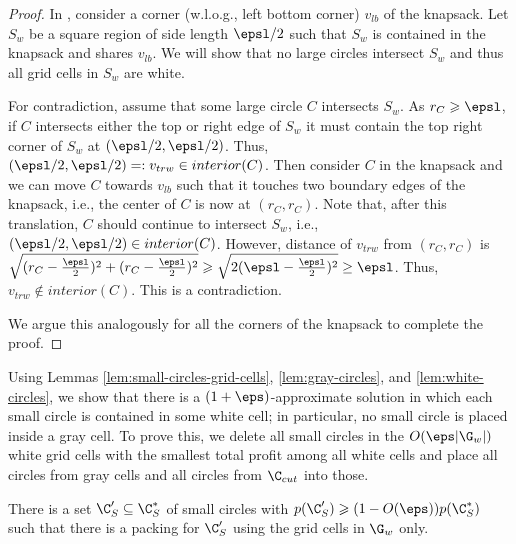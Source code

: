 \begin{proof}
	In , consider a corner (w.l.o.g., left bottom corner) $v_{lb}$ of the knapsack. Let  $S_w$ be a square region of side length $\epsl/2$ such that $S_w$ is contained in the knapsack and shares $v_{lb}$.
	We will show that no large circles intersect $S_w$ and thus all grid cells in $S_w$ are white.
	
	For contradiction, assume that some large circle $C$ intersects $S_w$. As $r_C \geqslant \epsl$, if $C$ intersects either the top or right edge of $S_w$ it must contain the top right corner of $S_w$ at $(\epsl/2, \epsl/2)$.  Thus, $(\epsl/2, \epsl/2)=: v_{trw} \in interior(C)$. 
	Then consider $C$ in the knapsack and we can move $C$ towards $v_{lb}$  such that it touches two boundary edges of the knapsack, i.e.,  the center of $C$ is now at $(r_C, r_C)$. Note that, after this translation, $C$ should continue to intersect $S_w$, i.e.,  $(\epsl/2, \epsl/2) \in interior(C)$. 
	However, distance of $v_{trw}$ from $(r_C, r_C)$ is $\sqrt{(r_C-\frac{\epsl}{2})^2 + (r_C-\frac{\epsl}{2})^2} \geqslant \sqrt{2(\epsl-\frac{\epsl}{2})^2} \ge \epsl$.
	Thus,  $v_{trw} \notin interior(C)$. This is a contradiction. 
	
	We argue this analogously for all the corners of the knapsack to complete the proof. 
\end{proof}


Using Lemmas \ref{lem:small-circles-grid-cells}, \ref{lem:gray-circles},
and \ref{lem:white-circles}, we show that there is a $(1+\eps)$-approximate
solution in which each small circle is contained in some white cell;
in particular, no small circle is placed inside a gray cell. To prove
this, we delete all small circles in the $O(\eps |\G_w|)$ white grid
cells with the smallest total profit among all white cells and place all circles from gray cells and
all circles from $\C_{cut}$ into those.

\begin{lem}%
	\label{lem:small-circles-white-grid-cells-1}
	There is a set $\C'_S \subseteq \C^*_S$ of small circles with $p(\C'_S)\geqslant (1-O(\eps)) p(\C^*_S)$ such that there is a packing for $\C'_S$ using the grid cells in $\G_w$ only.
	\end{lem}


